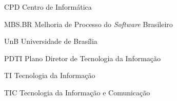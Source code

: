\begin{siglas}
\item[CPD] Centro de Informática
\item[MBS.BR] Melhoria de Processo do \textit{Software} Brasileiro 
\item[UnB] Universidade de Brasília
\item[PDTI] Plano Diretor de Tecnologia da Informação
\item[TI] Tecnologia da Informação
\item[TIC] Tecnologia da Informação e Comunicação
\end{siglas}